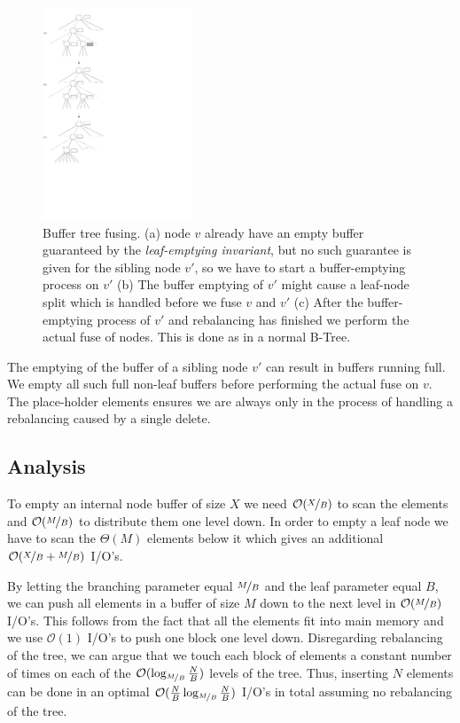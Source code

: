 \documentclass[twoside,11pt,openright]{report}
\begin{document}
\begin{figure}[H]
	\centering
	\includegraphics[width=0.4\textwidth]{../figures/buffer_tree_fuse}
	\caption{Buffer tree fusing. (a) node $v$ already have an empty buffer guaranteed by the \textit{leaf-emptying invariant}, but no such guarantee is given for the sibling node $v'$, so we have to start a buffer-emptying process on $v'$ (b) The buffer emptying of $v'$ might cause a leaf-node split which is handled before we fuse $v$ and $v'$ (c) After the buffer-emptying process of $v'$ and rebalancing has finished we perform the actual fuse of nodes. This is done as in a normal B-Tree.}
	\label{fig:buffer_tree_fuse}
\end{figure}

The emptying of the buffer of a sibling node $v'$ can result in buffers running full. We empty all such full non-leaf buffers before performing the actual fuse on $v$. The place-holder elements ensures we are always only in the process of handling a rebalancing caused by a single delete.

\subsection{Analysis}
To empty an internal node buffer of size $X$ we need $\mathcal{O}(\nicefrac{X}{B})$ to scan the elements and $\mathcal{O}(\nicefrac{M}{B})$ to distribute them one level down. In order to empty a leaf node we have to scan the $\Theta(M)$ elements below it which gives an additional $\mathcal{O}(\nicefrac{X}{B} + \nicefrac{M}{B})$ I/O's.

By letting the branching parameter equal $\nicefrac{M}{B}$ and the leaf parameter equal $B$, we can push all elements in a buffer of size $M$ down to the next level in $\mathcal{O}(\nicefrac{M}{B})$ I/O's. This follows from the fact that all the elements fit into main memory and we use $\mathcal{O}(1)$ I/O's to push one block one level down. Disregarding rebalancing of the tree, we can argue that we touch each block of elements a constant number of times on each of the $\mathcal{O}(\log_{\nicefrac{M}{B}} \frac{N}{B})$ levels of the tree. Thus, inserting $N$ elements can be done in an optimal $\mathcal{O}(\frac{N}{B} \log_{\nicefrac{M}{B}} \frac{N}{B})$ I/O's in total assuming no rebalancing of the tree.
\end{document}
